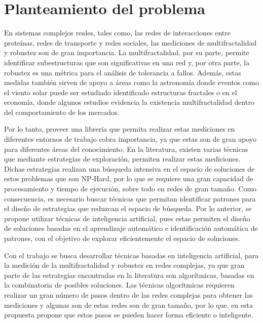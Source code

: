 \section{Planteamiento del problema}
En sistemas complejos reales, tales como, las redes de interacciones entre proteínas, redes de transporte y redes sociales, las mediciones de multifractalidad y robustez son de gran importancia. La multifractalidad, por su parte, permite identificar subestructuras que son significativas en una red\cite{Shuhei2011} y, por otra parte, la robustez es una métrica para el análisis de tolerancia a fallos\cite{Martin-Hernandez2013}. Además, estas medidas también sirven de apoyo a áreas como la astronomía donde eventos como el viento solar puede ser estudiado identificado estructuras fractales\cite{Macek2007} o en el economía, donde algunos estudios evidencia la existencia multifractalidad dentro del comportamiento de los mercados\cite{Caraiani2012}.

Por lo tanto, proveer una librería que permita realizar estas mediciones en diferentes entornos de trabajo cobra importancia, ya que estas son de gran apoyo para diferentes áreas del conocimiento. En la literatura, existen varias técnicas que mediante estrategias de exploración, permiten realizar estas mediciones. Dichas estrategias realizan una búsqueda intensiva en el espacio de soluciones de estos problemas que son NP-Hard, por lo que se requiere una gran capacidad de procesamiento y tiempo de ejecución, sobre todo en redes de gran tamaño. Como consecuencia, es necesario buscar técnicas que permitan identificar patrones para el diseño de estrategias que reduzcan el espacio de búsqueda. Por lo anterior, se propone utilizar técnicas de inteligencia artificial, pues estas permiten el diseño de soluciones basadas en el aprendizaje automático e identificación automática de patrones, con el objetivo de explorar eficientemente el espacio de soluciones.

Con el trabajo se busca desarrollar técnicas basadas en inteligencia artificial, para la medición de la multifractalidad y robustez en redes complejas, ya que gran parte de las estrategias encontradas en la literatura son algorítmicas, basadas en la combinatoria de posibles soluciones. Las técnicas algorítmicas requieren realizar un gran número de pasos dentro de las redes complejas para obtener las mediciones y algunas son de estas redes son de gran tamaño, por lo que, en esta propuesta propone que estos pasos se pueden hacer forma eficiente o inteligente.

